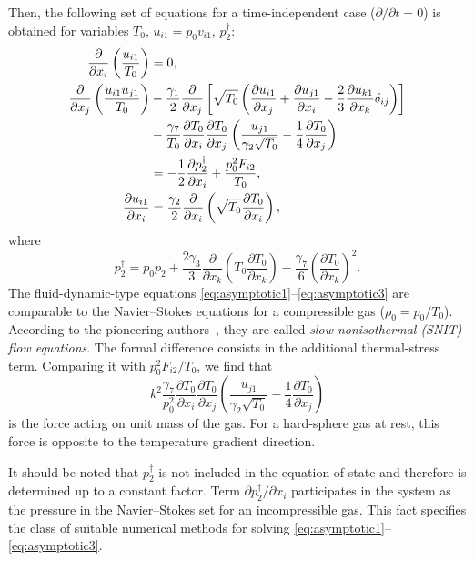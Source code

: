 \documentclass[smallextended, final]{svjour3} %
\newcommand{\pder}[2][]{\frac{\partial#1}{\partial#2}}
\newcommand{\Pder}[2][]{\partial#1/\partial#2}
\begin{document}
Then, the following set of equations for a time-independent case (\(\Pder{t} = 0\))
is obtained for variables \(T_0\), \(u_{i1} = p_0v_{i1}\), \(p_2^\dag\):
\begin{align}
    \pder{x_i}\left(\frac{u_{i1}}{T_0}\right) &= 0, \label{eq:asymptotic1} \\
    \pder{x_j}\left(\frac{u_{i1}u_{j1}}{T_0}\right)
        &-\frac{\gamma_1}2\pder{x_j}\left[\sqrt{T_0}\left(
            \pder[u_{i1}]{x_j} + \pder[u_{j1}]{x_i} - \frac23\pder[u_{k1}]{x_k}\delta_{ij}
        \right)\right] \notag\\
        &- \frac{\gamma_7}{T_0}\pder[T_0]{x_i}\pder[T_0]{x_j}\left(\frac{u_{j1}}{\gamma_2\sqrt{T_0}} - \frac{1}4\pder[T_0]{x_j}\right) \notag\\
        &= -\frac12\pder[p_2^\dag]{x_i} + \frac{p_0^2 F_{i2}}{T_0}, \label{eq:asymptotic2} \\
    \pder[u_{i1}]{x_i} &= \frac{\gamma_2}2\pder{x_i}\left(\sqrt{T_0}\pder[T_0]{x_i}\right), \label{eq:asymptotic3}
\end{align}
where
\begin{equation}\label{eq:dag_pressure}
    p_2^\dag = p_0 p_2
        + \frac{2\gamma_3}{3}\pder{x_k}\left(T_0\pder[T_0]{x_k}\right)
        - \frac{\gamma_7}{6}\left(\pder[T_0]{x_k}\right)^2.
\end{equation}
The fluid-dynamic-type equations \eqref{eq:asymptotic1}--\eqref{eq:asymptotic3}
are comparable to the Navier--Stokes equations for a compressible gas (\(\rho_0 = p_0/T_0\)).
According to the pioneering authors~\cite{Kogan1971, Kogan1976, ExperimentsNTFS2003},
they are called \emph{slow nonisothermal (SNIT) flow equations}.
The formal difference consists in the additional thermal-stress term.
Comparing it with \(p_0^2F_{i2}/T_0\), we find that
\begin{equation}\label{eq:force}
    k^2\frac{\gamma_7}{p_0^2}\pder[T_0]{x_i}\pder[T_0]{x_j}\left(\frac{u_{j1}}{\gamma_2\sqrt{T_0}} - \frac{1}4\pder[T_0]{x_j}\right)
\end{equation}
is the force acting on unit mass of the gas.
For a hard-sphere gas at rest, this force is opposite to the temperature gradient direction.

It should be noted that \(p_2^\dag\) is not included in the equation of state and
therefore is determined up to a constant factor.
Term \(\Pder[p_2^\dag]{x_i}\) participates in the system as the pressure
in the Navier--Stokes set for an incompressible gas.
This fact specifies the class of suitable numerical methods
for solving \eqref{eq:asymptotic1}--\eqref{eq:asymptotic3}.
\end{document}
